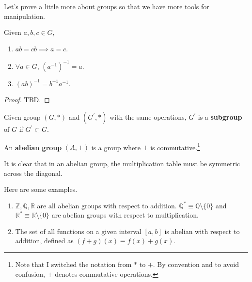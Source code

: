   \begin{example}
    
  \end{example}

  Let's prove a little more about groups so that we have more tools for manipulation. 

  \begin{lemma}
    Given $a, b, c \in G$, 
    \begin{enumerate}
      \item $ab = cb \implies a = c$. 
      \item $\forall a \in G$, $(a^{-1})^{-1} = a$. 
      \item $(ab)^{-1} = b^{-1} a^{-1}$. 
    \end{enumerate}
  \end{lemma}
  \begin{proof}
    TBD. 
  \end{proof}

  \begin{definition}[Subgroup]
    Given group $(G, \ast)$ and $(G^\prime, \ast)$ with the same operations, $G^\prime$ is a \textbf{subgroup} of $G$ if $G^\prime \subset G$. 
  \end{definition} 

  \begin{definition}
    An \textbf{abelian group} $(A, +)$ is a group where $+$ is commutative.\footnote{Note that I switched the notation from $\ast$ to $+$. By convention and to avoid confusion, $+$ denotes commutative operations. }
  \end{definition} 

  It is clear that in an abelian group, the multiplication table must be symmetric across the diagonal. 

  \begin{example}
    Here are some examples. 
    \begin{enumerate}
      \item $\mathbb{Z}, \mathbb{Q}, \mathbb{R}$ are all abelian groups with respect to addition. $\mathbb{Q}^{*} \equiv \mathbb{Q} \setminus \{0\}$ and $\mathbb{R}^{*} \equiv \mathbb{R} \setminus \{0\}$ are abelian groups with respect to multiplication.
      \item The set of all functions on a given interval $[a,b]$ is abelian with respect to addition, defined as $(f+g)(x) \equiv f(x) + g(x)$. 
    \end{enumerate}
  \end{example} 

